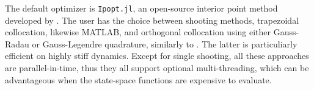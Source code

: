 The default optimizer is \texttt{Ipopt.jl}, an open-source interior point method developed by \citet{ipopt}. The user has the choice between shooting methods, trapezoidal collocation, likewise MATLAB, and orthogonal collocation using either Gauss-Radau or Gauss-Legendre quadrature, similarly to \citet{doMPC, gekko, apmonitor, acados}. The latter is particuliarly efficient on highly stiff dynamics. Except for single shooting, all these approaches are parallel-in-time, thus they all support optional multi-threading, which can be advantageous when the state-space functions are expensive to evaluate.